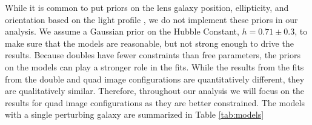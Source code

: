 While it is common to put priors on the lens galaxy position, ellipticity, and orientation based on the light profile \citep[e.g.][]{Bolton08}, we do not implement these priors in our analysis. We assume a Gaussian prior on the Hubble Constant, $h = 0.71 \pm 0.3$, to make sure that the models are reasonable, but not strong enough to drive the results. Because doubles have fewer constraints than free parameters, the priors on the models can play a stronger role in the fits. While the results from the fits from the double and quad image configurations are quantitatively different, they are qualitatively similar. Therefore, throughout our analysis we will focus on the results for quad image configurations as they are better constrained.  
The models with a single perturbing galaxy are summarized in Table \ref{tab:models}